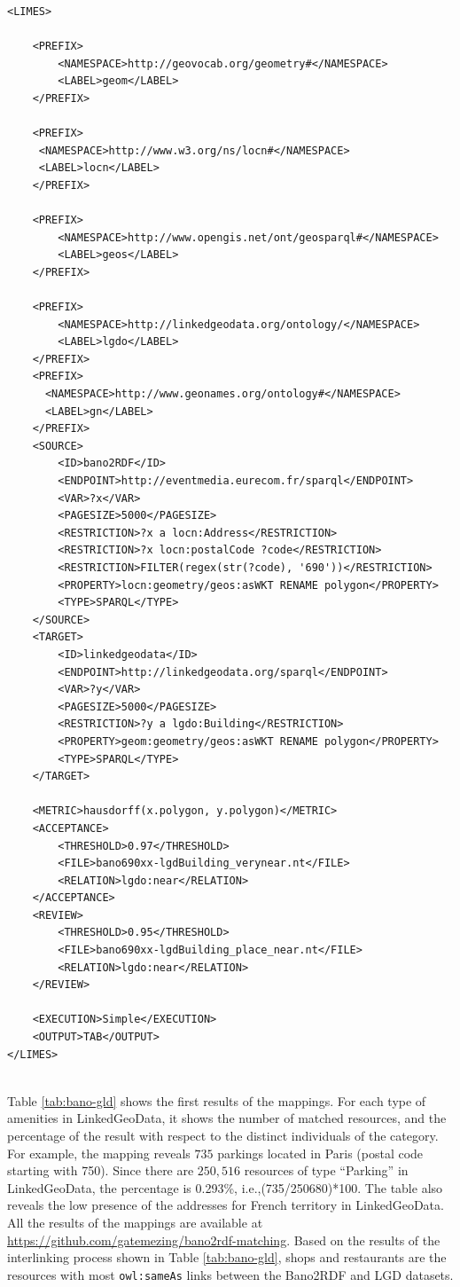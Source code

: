 \begin{lstlisting}
<LIMES>
	
	<PREFIX>
		<NAMESPACE>http://geovocab.org/geometry#</NAMESPACE>
		<LABEL>geom</LABEL>
	</PREFIX>

	<PREFIX>
     <NAMESPACE>http://www.w3.org/ns/locn#</NAMESPACE>
     <LABEL>locn</LABEL>
    </PREFIX>
    
	<PREFIX>
		<NAMESPACE>http://www.opengis.net/ont/geosparql#</NAMESPACE>
		<LABEL>geos</LABEL>
	</PREFIX>
	
	<PREFIX>
		<NAMESPACE>http://linkedgeodata.org/ontology/</NAMESPACE>
		<LABEL>lgdo</LABEL>
	</PREFIX>
	<PREFIX>
      <NAMESPACE>http://www.geonames.org/ontology#</NAMESPACE>
      <LABEL>gn</LABEL>
    </PREFIX>
	<SOURCE>
		<ID>bano2RDF</ID>
		<ENDPOINT>http://eventmedia.eurecom.fr/sparql</ENDPOINT>
		<VAR>?x</VAR>
		<PAGESIZE>5000</PAGESIZE>
		<RESTRICTION>?x a locn:Address</RESTRICTION>
		<RESTRICTION>?x locn:postalCode ?code</RESTRICTION>
		<RESTRICTION>FILTER(regex(str(?code), '690'))</RESTRICTION>
		<PROPERTY>locn:geometry/geos:asWKT RENAME polygon</PROPERTY>
		<TYPE>SPARQL</TYPE>
	</SOURCE>
	<TARGET>
		<ID>linkedgeodata</ID>
		<ENDPOINT>http://linkedgeodata.org/sparql</ENDPOINT>
		<VAR>?y</VAR>
		<PAGESIZE>5000</PAGESIZE>
		<RESTRICTION>?y a lgdo:Building</RESTRICTION>
		<PROPERTY>geom:geometry/geos:asWKT RENAME polygon</PROPERTY>
		<TYPE>SPARQL</TYPE>
	</TARGET>
	
	<METRIC>hausdorff(x.polygon, y.polygon)</METRIC>
	<ACCEPTANCE>
		<THRESHOLD>0.97</THRESHOLD>
		<FILE>bano690xx-lgdBuilding_verynear.nt</FILE>
		<RELATION>lgdo:near</RELATION>
	</ACCEPTANCE>
	<REVIEW>
		<THRESHOLD>0.95</THRESHOLD>
		<FILE>bano690xx-lgdBuilding_place_near.nt</FILE>
		<RELATION>lgdo:near</RELATION>
	</REVIEW>

	<EXECUTION>Simple</EXECUTION>
	<OUTPUT>TAB</OUTPUT>
</LIMES>
	
\end{lstlisting}

Table \ref{tab:bano-gld} shows the first results of the mappings. For each type of amenities in LinkedGeoData, it shows the number of matched resources, and the percentage of the result with respect to the distinct individuals of the category. For example, the mapping reveals $735$ parkings located in Paris (postal code starting with 750). Since there are $250,516$ resources of type ``Parking'' in LinkedGeoData, the percentage is 0.293\%, i.e.,(735/250680)*100.  The table also reveals the low presence of the addresses for French territory in LinkedGeoData. All the results of the mappings are available at \url{https://github.com/gatemezing/bano2rdf-matching}. Based on the results of the interlinking process shown in Table \ref{tab:bano-gld}, shops and restaurants are the resources with most \texttt{owl:sameAs} links between the Bano2RDF and LGD datasets.

